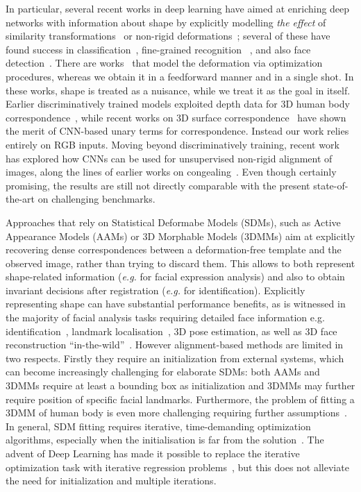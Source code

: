 In particular, several recent works in deep learning have aimed at enriching deep networks with information about shape by explicitly modelling {\em the effect} of  similarity transformations~\cite{PapandreouKS15}
or non-rigid deformations~\cite{JaderbergSZK15,HandaBPSMD16,ChenHW016}; several of these have found success in classification~\cite{PapandreouKS15}, fine-grained recognition ~\cite{JaderbergSZK15}, and also face detection~\cite{ChenHW016}. There are works~\cite{lades1993distortion,pedersoli2015elastic} that model the deformation via optimization procedures, whereas we obtain it in a feedforward manner and in a single shot. In these works, shape is treated as a nuisance, while we treat it as the goal in itself. 
Earlier discriminatively trained models exploited depth data for 3D human body correspondence~\cite{TaylorSSF12,WeiHCVL15}, while recent works on 3D surface correspondence~\cite{Br1,Br2} have shown the merit of CNN-based unary terms for correspondence. Instead our work relies entirely on RGB inputs.
Moving beyond discriminatively training, recent work~\cite{ThewlisBV17a}  has explored how CNNs can be used for unsupervised non-rigid alignment of images, along the lines of earlier works on congealing~\cite{Learned-Miller06,KokkinosY07}. Even though certainly promising, the results are still not directly comparable with the present state-of-the-art on challenging benchmarks.

Approaches that rely on  Statistical Deformabe Models (SDMs), such as Active Appearance Models (AAMs) or 3D Morphable Models (3DMMs) aim at explicitly recovering  dense correspondences between a deformation-free template and the observed image, rather than trying to discard them. 
This allows to both represent shape-related information (\textit{e.g.} for facial expression analysis) and also to obtain invariant decisions after registration (\textit{e.g.} for identification). 
Explicitly representing shape  can have substantial performance benefits, as is witnessed in the majority of facial analysis tasks requiring detailed face information e.g. identification~\cite{TaigmanYRW14}, landmark localisation~\cite{sagonas2016300}, 3D pose estimation, as well as 3D face reconstruction ``in-the-wild''~\cite{jourabloo2016large}. 
However alignment-based methods are limited in two respects. Firstly they require an initialization from external systems, which can become increasingly challenging for elaborate SDMs: both AAMs and 3DMMs require at least a bounding box as initialization and 3DMMs may further require position of specific facial landmarks. Furthermore, the problem of fitting a 3DMM of human body is even more challenging requiring further assumptions~\cite{lassner2017unite}. In general, SDM fitting  requires iterative, time-demanding optimization algorithms, especially when the initialisation is far from the solution~\cite{booth20173d}. The advent of Deep Learning has made it possible to replace the iterative optimization task with iterative regression problems~\cite{trigeorgis2016mnemonic}, but this does not alleviate the need for initialization and multiple iterations. 

